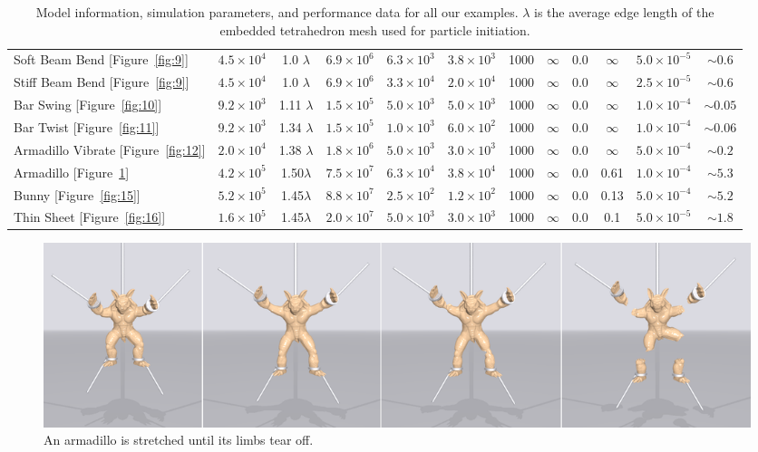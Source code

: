 \begin{table}[htb]
{\begin{tabular}{lccccccccccc}
  Soft Beam Bend [Figure~\ref{fig:9}]      & $4.5\times10^4$ & 1.0 $\lambda$ & $6.9\times10^6$ & $6.3\times10^3$   & $3.8\times10^3$          & 1000 & $\infty $ & 0.0             & $\infty$ & $5.0\times10^{-5}$   & $\sim0.6$ \\
  Stiff Beam Bend [Figure~\ref{fig:9}]     & $4.5\times10^4$ & 1.0 $\lambda$ & $6.9\times10^6$ & $3.3\times10^4$   & $2.0\times10^4$          & 1000 & $\infty $ & 0.0             & $\infty$ & $2.5\times10^{-5}$ & $\sim0.6$ \\
  Bar Swing [Figure~\ref{fig:10}]     & $9.2\times10^3$ & 1.11 $\lambda$ & $1.5\times10^5$ & $5.0\times10^3$   & $5.0\times10^3$          & 1000 & $\infty $ & 0.0             & $\infty$ & $1.0\times10^{-4}$ & $\sim0.05$ \\
  Bar Twist [Figure~\ref{fig:11}]     & $9.2\times10^3$ & 1.34 $\lambda$ & $1.5\times10^5$ & $1.0\times10^3$   & $6.0\times10^2$          & 1000 & $\infty $ & 0.0             & $\infty$ & $1.0\times10^{-4}$ & $\sim0.06$ \\
  Armadillo Vibrate [Figure~\ref{fig:12}]     & $2.0\times10^4$ & 1.38 $\lambda$ & $1.8\times10^6$ & $5.0\times10^3$   & $3.0\times10^3$          & 1000 & $\infty $ & 0.0             & $\infty$ & $5.0\times10^{-4}$ & $\sim0.2$ \\
  Armadillo [Figure~\ref{fig:13}]          & $4.2\times10^5$ & 1.50$\lambda$ & $7.5\times10^7$ & $6.3\times10^4$   & $3.8\times10^4$          & 1000 & $\infty $ & 0.0             & 0.61     & $1.0\times10^{-4}$          & $\sim5.3$ \\
  Bunny [Figure~\ref{fig:15}]              & $5.2\times10^5$ & 1.45$\lambda$ & $8.8\times10^7$ & $2.5\times10^2$   & $1.2\times10^2$          & 1000 & $\infty $ & 0.0             & 0.13     & $5.0\times10^{-4}$          & $\sim5.2$ \\
  Thin Sheet [Figure~\ref{fig:16}]              & $1.6\times10^5$ & 1.45$\lambda$ & $2.0\times10^7$ & $5.0\times10^3$   & $3.0\times10^3$          & 1000 & $\infty $ & 0.0             & 0.1     & $5.0\times10^{-5}$          & $\sim1.8$ \\
  \hline
\end{tabular}
}
\caption{Model information, simulation parameters, and performance data for all our examples. $\lambda$ is the average edge length of the embedded tetrahedron mesh used for particle initiation.}
\label{tab:1}
\end{table}
\begin{figure}[t]
  \centering
  \includegraphics[width=\linewidth]{../figs/demo_tear_armadillo.png}
  \caption{\label{fig:13}
  An armadillo is stretched until its limbs tear off.
}
\end{figure}
